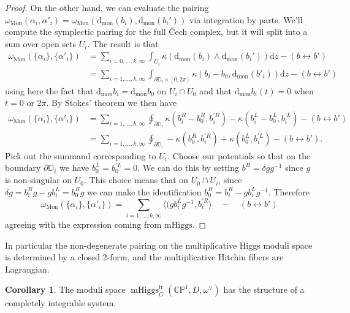 \documentclass[11pt, oneside, reqno]{amsart}
\theoremstyle{definition} \newtheorem{definition}{Definition}[section]
\newtheorem{corollary}[definition]{Corollary}
\theoremstyle{definition} \newtheorem{remark}[definition]{Remark}
\theoremstyle{definition} \newtheorem{remarks}[definition]{Remarks}
\theoremstyle{definition} \newtheorem{question}[definition]{Question}
\theoremstyle{definition} \newtheorem*{note}{Note}
\theoremstyle{definition} \newtheorem{example}[definition]{Example}
\theoremstyle{definition} \newtheorem{examples}[definition]{Examples}
\newcommand{\bb}[1]{\mathbb{#1}}
\newcommand{\mr}[1]{\mathrm{#1}}
\newcommand{\dd}{\partial}
\DeclareMathOperator{\mhiggs}{mHiggs}
\renewcommand{\d}{\mathrm{d}}
\newcommand{\fr}{\mathrm{fr}}
\begin{document}
\begin{proof}
On the other hand, we can evaluate the pairing $\omega_{\mr{Mon}}(\alpha_i,\alpha'_i) = \omega_{\mr{Mon}}(\d_{\mr{mon}}(b_i),\d_{\mr{mon}}(b_i'))$ via integration by parts. We'll compute the symplectic pairing for the full \v Cech complex, but it will split into a sum over open sets $U_i$.  The result is that 
\begin{align*}
\omega_{\mr{Mon}}(\{\alpha_i\},\{\alpha'_i\}) &= \sum_{i=0,\ldots,k,\infty} \int_{U_i} \kappa(\d_{\mr{mon}}(b_i) \wedge \d_{\mr{mon}}(b_i')) \d z - (b \leftrightarrow b')\\
&= \sum_{i=1,\ldots,k,\infty} \int_{\dd \bb D_i \times [0,2\pi]} \kappa(b_i - b_0, \d_{\mr{mon}}(b'_i)) \d z - (b \leftrightarrow b')
\end{align*}
using here the fact that $\d_{\mr{mon}}b_i = \d_{\mr{mon}} b_0$ on $U_i \cap U_0$ and that $\d_{\mr{mon}} b_i(t) = 0$ when $t = 0$ or $2\pi$.  By Stokes' theorem we then have
\begin{align*}
 \omega_{\mr{Mon}}(\{\alpha_i\},\{\alpha'_i\})&= \sum_{i=1,\ldots,k,\infty} \oint_{\dd \bb D_i} \kappa(b_i^R - b_0^R, b_i^{'R}) - \kappa(b_i^L - b_0^L, b_i^{'L}) - (b \leftrightarrow b') \\
 &= \sum_{i=1,\ldots,k,\infty} \oint_{\dd \bb D_i} - \kappa(b_0^R, b_i^{'R}) + \kappa(b_0^L, b_i^{'L}) - (b \leftrightarrow b').
\end{align*}
Pick out the summand corresponding to $U_i$.  Choose our potentials so that on the boundary $\dd \bb D_i$ we have $b_0^L = b_0^{'L} = 0$.  We can do this by setting $b^{R} = \delta g g^{-1}$ since $g$ is non-singular on $U_0$.  This choice means that on $U_0 \cap U_i$, since $\delta g  = b_{i} ^R g - g b_i^L = b_0^{R} g $ we can make the identification $ b_0^{R} = b_{i}^{R} - g b_{i}^{L} g^{-1}$.  Therefore
\[\omega_{\mr{Mon}}(\{\alpha_i\},\{\alpha'_i\}) = \sum_{i=1,\ldots,k,\infty} \langle(g b_i^{L} g^{-1}, b_i^{'R}\rangle \quad - \quad  (b \leftrightarrow b')\]
agreeing with the expression coming from $\mr{mHiggs}$. 
\end{proof}

In particular the non-degenerate pairing on the multiplicative Higgs moduli space is determined by a closed 2-form, and the multiplicative Hitchin fibers are Lagrangian.

\begin{corollary}
The moduli space $\mhiggs^\fr_G(\bb{CP}^1,D,\omega^\vee)$ has the structure of a completely integrable system.
\end{corollary}
\end{document}
